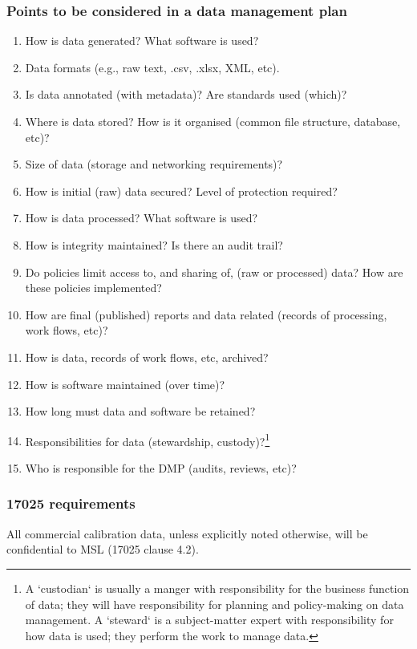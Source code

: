 \subsubsection{Points to be considered in a data management plan}
\begin{enumerate}
 \item How is data generated? What software is used? 
 \item Data formats (e.g., raw text, .csv, .xlsx, XML, etc). 
 \item Is data annotated (with metadata)? Are standards used (which)? 
 \item Where is data stored? How is it organised (common file structure, database, etc)? 
 \item Size of data (storage and networking requirements)? 
 \item How is initial (raw) data secured? Level of protection required? 
 \item How is data processed? What software is used? 
 \item How is integrity maintained? Is there an audit trail?
 \item Do policies limit access to, and sharing of, (raw or processed) data? How are these policies implemented?
 \item How are final (published) reports and data related (records of processing, work flows, etc)?
 \item How is data, records of work flows, etc, archived? 
 \item How is software maintained (over time)?
 \item How long must data and software be retained?  
 \item Responsibilities for data (stewardship, custody)?\footnote{A `custodian`  is usually a manger with responsibility for the business function of data; they will have responsibility for planning and policy-making on data management. A `steward` is a subject-matter expert with responsibility for how data is used; they perform the work to manage data.}
 \item Who is responsible for the DMP (audits, reviews, etc)? 
\end{enumerate}

\subsubsection{17025 requirements}

All commercial calibration data, unless explicitly noted otherwise, will be confidential to MSL (17025 clause 4.2).

